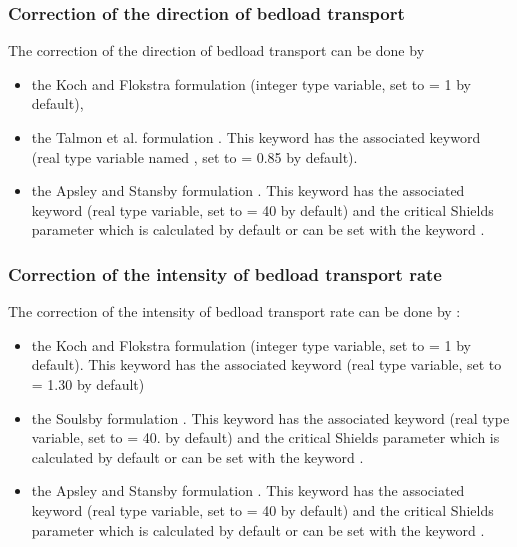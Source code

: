 \subsubsection{Correction of the direction of bedload transport}
The correction of the direction of bedload transport can be done by
\begin{itemize}
\item the Koch and Flokstra formulation  (integer type variable, set to {\ttfamily = 1} by default),
\item the Talmon et al. formulation . This keyword has the associated keyword  (real type variable named , set to {\ttfamily = 0.85} by default).
\item the Apsley and Stansby formulation  . This keyword has the associated keyword  (real type variable, set to {\ttfamily = 40} by default) and the critical Shields parameter which is calculated by default or can be set with the keyword .
\end{itemize}

\subsubsection{Correction of the intensity of bedload transport rate}
The correction of the intensity of bedload transport rate can be done by :
\begin{itemize}
\item the Koch and Flokstra formulation  (integer type variable, set to {\ttfamily = 1} by default). This keyword has the associated keyword  (real type variable, set to {\ttfamily = 1.30} by default)
\item the Soulsby formulation . This keyword has the associated keyword  (real type variable, set to {\ttfamily = 40.} by default) and the critical Shields parameter which is calculated by default or can be set with the keyword .
\item the Apsley and Stansby formulation . This keyword has the associated keyword  (real type variable, set to {\ttfamily = 40} by default) and the critical Shields parameter which is calculated by default or can be set with the keyword .
\end{itemize}

